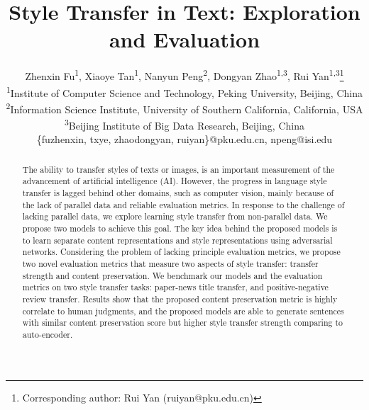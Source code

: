 \documentclass[letterpaper]{article} \usepackage{aaai18}  \usepackage{times}  \usepackage{helvet}  \usepackage{courier}  \usepackage{url}  \usepackage{graphicx}  \usepackage{amsmath}
\begin{document}
\title{Style Transfer in Text: Exploration and Evaluation}
\author{
Zhenxin Fu\textsuperscript{1}, Xiaoye Tan\textsuperscript{1}, Nanyun Peng\textsuperscript{2},
 Dongyan Zhao\textsuperscript{1,3}, Rui Yan\textsuperscript{1,3}\thanks{Corresponding author: Rui Yan (ruiyan@pku.edu.cn)} \\
\textsuperscript{1}{Institute of Computer Science and Technology, Peking University, Beijing, China}\\
\textsuperscript{2}{Information Science Institute, University of Southern California, California, USA}\\
\textsuperscript{3}{Beijing Institute of Big Data Research, Beijing, China} \\
\{fuzhenxin, txye, zhaodongyan, ruiyan\}@pku.edu.cn, npeng@isi.edu
}


\maketitle
\begin{abstract}
The ability to transfer styles of texts or images, is an important measurement of the advancement of artificial intelligence (AI).
However,  the progress in language style transfer is lagged behind other domains, 
such as computer vision, mainly because of the lack of parallel data and reliable evaluation metrics. 
In response to the challenge of lacking parallel data, we explore learning style transfer from non-parallel data. 
We propose two models to achieve this goal. 
The key idea behind the proposed 
models is to learn separate content representations and style representations using adversarial networks. 
Considering the problem of lacking principle evaluation metrics, we propose two novel evaluation metrics that measure two aspects of style transfer: 
transfer strength and content preservation. 
We benchmark our models and the evaluation metrics on two style transfer tasks: paper-news title transfer, 
and positive-negative review transfer.  
Results show that the proposed content preservation metric is highly correlate to human judgments,  
and the proposed models are able to generate sentences with similar content preservation score but higher style transfer strength comparing to auto-encoder.
\end{abstract}
\noindent 
\end{document}

